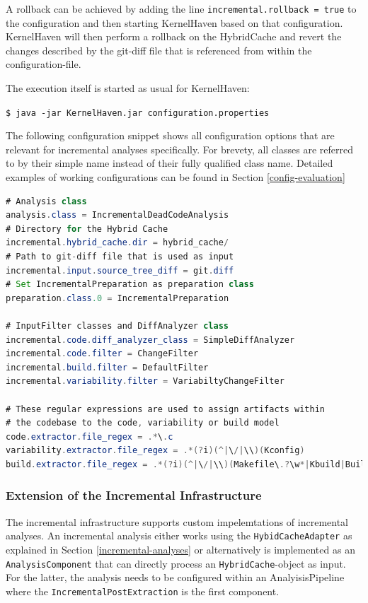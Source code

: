 \documentclass[a4paper]{article}
\begin{document}
A rollback can be achieved by adding the line \texttt{incremental.rollback = true} to the configuration and then starting KernelHaven based on that configuration. KernelHaven will then perform a rollback on the HybridCache and revert the changes described by the git-diff file that is referenced from within the configuration-file.

The execution itself is started as usual for KernelHaven:

\texttt{\$ java -jar KernelHaven.jar configuration.properties}

The following configuration snippet shows all configuration options that are relevant for incremental analyses specifically. For brevety, all classes are referred to by their simple name instead of their fully qualified class name. Detailed examples of working configurations can be found in Section \ref{config-evaluation}

\begin{lstlisting}[language=java]
# Analysis class
analysis.class = IncrementalDeadCodeAnalysis
# Directory for the Hybrid Cache
incremental.hybrid_cache.dir = hybrid_cache/
# Path to git-diff file that is used as input
incremental.input.source_tree_diff = git.diff
# Set IncrementalPreparation as preparation class
preparation.class.0 = IncrementalPreparation

# InputFilter classes and DiffAnalyzer class
incremental.code.diff_analyzer_class = SimpleDiffAnalyzer
incremental.code.filter = ChangeFilter
incremental.build.filter = DefaultFilter
incremental.variability.filter = VariabiltyChangeFilter

# These regular expressions are used to assign artifacts within
# the codebase to the code, variability or build model  
code.extractor.file_regex = .*\.c
variability.extractor.file_regex = .*(?i)(^|\/|\\)(Kconfig)
build.extractor.file_regex = .*(?i)(^|\/|\\)(Makefile\.?\w*|Kbuild|Build)
\end{lstlisting}

\subsubsection{Extension of the Incremental Infrastructure}

The incremental infrastructure supports custom impelemtations of incremental analyses. An incremental analysis either works using the \texttt{Hybid\-Cache\-Adapter} as explained in Section \ref{incremental-analyses} or alternatively is implemented as an \texttt{Analysis\-Component} that can directly process an \texttt{Hybrid\-Cache}-object as input. For the latter, the analysis needs to be configured within an AnalyisisPipeline where the \texttt{Incremental\-Post\-Extraction} is the first component.
\end{document}
